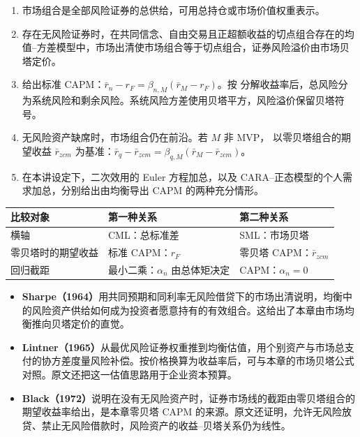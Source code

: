 \WJChapterSummary
\begin{tcolorbox}[summary]
\begin{enumerate}
 \item 市场组合是全部风险证券的总供给，可用总持仓或市场价值权重表示。
 \item 存在无风险证券时，在共同信念、自由交易且正超额收益的切点组合存在的均值--方差模型中，市场出清使市场组合等于切点组合，证券风险溢价由市场贝塔定价。
 \item {} 给出标准 CAPM：$\bar r_n-r_F=\beta_{n,M}(\bar r_M-r_F)$。按 分解收益率后，总风险分为系统风险和剩余风险。系统风险方差使用贝塔平方，风险溢价保留贝塔符号。
 \item 无风险资产缺席时，市场组合仍在前沿。若 $M$ 非 MVP， 以零贝塔组合的期望收益 $\bar r_{zcm}$ 为基准：$\bar r_q-\bar r_{zcm}=\beta_{q,M}(\bar r_M-\bar r_{zcm})$。
 \item 在本讲设定下，二次效用的 Euler 方程加总，以及 CARA--正态模型的个人需求加总，分别给出由均衡导出 CAPM 的两种充分情形。

\end{enumerate}
\end{tcolorbox}

\begin{center}
\small
\begin{tabular}{@{}lll@{}}
\toprule
比较对象 & 第一种关系 & 第二种关系\\
\midrule
横轴 & CML：总标准差 & SML：市场贝塔\\
零贝塔时的期望收益 & 标准 CAPM：$r_F$ & 零贝塔 CAPM：$\bar r_{zcm}$\\
回归截距 & 最小二乘：$\alpha_n$ 由总体矩决定 & CAPM：$\alpha_n=0$\\
\bottomrule
\end{tabular}
\end{center}

\begin{tcolorbox}[knowledge,breakable=false,title={参考文献与本章贡献}]
\begin{itemize}
 \item \textbf{Sharpe（1964）}用共同预期和同利率无风险借贷下的市场出清说明，均衡中的风险资产供给如何成为投资者愿意持有的有效组合。这给出了本章由市场均衡推向贝塔定价的直觉。
 \item \textbf{Lintner（1965）}从最优风险证券权重推到均衡估值，用个别资产与市场总支付的协方差度量风险补偿。按价格换算为收益率后，可与本章的市场贝塔公式对照。原文还把这一估值思路用于企业资本预算。
 \item \textbf{Black（1972）}说明在没有无风险资产时，证券市场线的截距由零贝塔组合的期望收益率给出，是本章零贝塔 CAPM 的来源。原文还证明，允许无风险放贷、禁止无风险借款时，风险资产的收益--贝塔关系仍为线性。
\end{itemize}
\end{tcolorbox}
\fi

\WJChapterExercises

\endgroup
